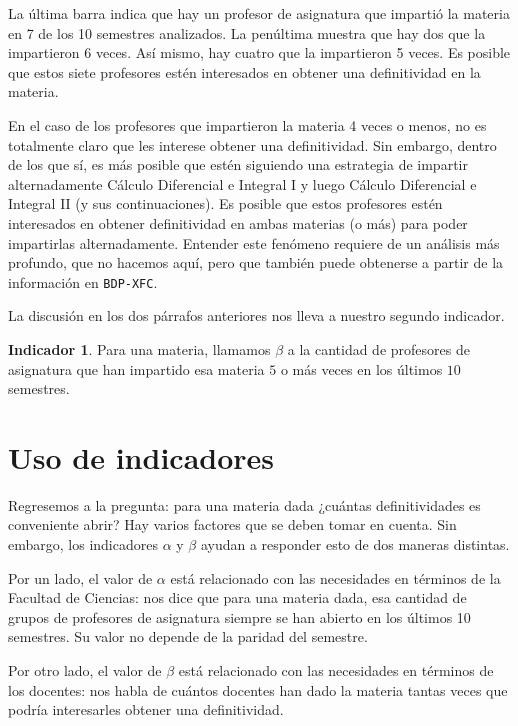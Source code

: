 \documentclass[twocolumn]{article}
\theoremstyle{definition}
\newtheorem{indicador}{Indicador}
\begin{document}
La última barra indica que hay un profesor de asignatura que impartió la materia en 7 de los 10 semestres analizados. La penúltima muestra que hay dos que la impartieron 6 veces. Así mismo, hay cuatro que la impartieron 5 veces. Es posible que estos siete profesores estén interesados en obtener una definitividad en la materia.

En el caso de los profesores que impartieron la materia 4 veces o menos, no es totalmente claro que les interese obtener una definitividad. Sin embargo, dentro de los que sí, es más posible que estén siguiendo una estrategia de impartir alternadamente Cálculo Diferencial e Integral I y luego Cálculo Diferencial e Integral II (y sus continuaciones). Es posible que estos profesores estén interesados en obtener definitividad en ambas materias (o más) para poder impartirlas alternadamente. Entender este fenómeno requiere de un análisis más profundo, que no hacemos aquí, pero que también puede obtenerse a partir de la información en \texttt{BDP-XFC}.

La discusión en los dos párrafos anteriores nos lleva a nuestro segundo indicador.

\begin{indicador}
    Para una materia, llamamos $\beta$ a la cantidad de profesores de asignatura que han impartido esa materia $5$ o más veces en los últimos $10$ semestres.
\end{indicador}
 
\section{Uso de indicadores}

Regresemos a la pregunta: para una materia dada ¿cuántas definitividades es conveniente abrir? Hay varios factores que se deben tomar en cuenta. Sin embargo, los indicadores $\alpha$ y $\beta$ ayudan a responder esto de dos maneras distintas.

Por un lado, el valor de $\alpha$ está relacionado con las necesidades en términos de la Facultad de Ciencias: nos dice que para una materia dada, esa cantidad de grupos de profesores de asignatura siempre se han abierto en los últimos 10 semestres. Su valor no depende de la paridad del semestre.

Por otro lado, el valor de $\beta$ está relacionado con las necesidades en términos de los docentes: nos habla de cuántos docentes han dado la materia tantas veces que podría interesarles obtener una definitividad.
\end{document}
